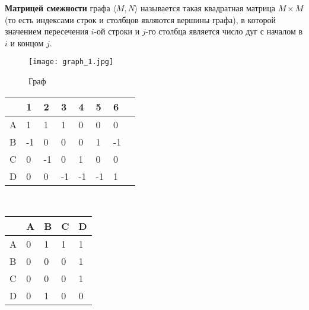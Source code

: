 \vspace{3mm}

\textbf{Матрицей смежности} графа $\langle M, N\rangle$ называется такая квадратная матрица $M \times M$
(то есть индексами строк и столбцов являются вершины графа), 
в которой значением пересечения $i$-ой строки и $j$-го столбца является число дуг с началом в $i$ и концом $j$.

\begin{figure}[!h]
    \centering 
    \texttt{[image: graph\_1.jpg]}
    \caption{Граф}
    \label{graph_for_matrix}
\end{figure}

\begin{figure*}[!h]
    \centering
    \begin{minipage}[t]{4cm}
        \centering
        \begin{tabular}[c]{ | l | l | l | l | l | l | l | l |}
            \hline
              & 1  & 2  & 3  & 4  & 5  & 6  \\ \hline
            A & 1  & 1  & 1  & 0  & 0  & 0  \\ \hline
            B & -1 & 0  & 0  & 0  & 1  & -1 \\ \hline
            C & 0  & -1 & 0  & 1  & 0  & 0  \\ \hline
            D & 0  & 0  & -1 & -1 & -1 & 1  \\
            \hline
        \end{tabular}
    \end{minipage}
    \hspace{3cm}
    \begin{minipage}[t]{4cm}\
        \centering
        \begin{tabular}[c]{ | l | l | l | l | l |}
            \hline
              & A & B & C & D \\ \hline
            A & 0 & 1 & 1 & 1 \\ \hline
            B & 0 & 0 & 0 & 1 \\ \hline
            C & 0 & 0 & 0 & 1 \\ \hline
            D & 0 & 1 & 0 & 0 \\
            \hline
        \end{tabular}
    \end{minipage}
    \caption{Способы матричного представления графа \ref{graph_for_matrix}: матрица инциденций
    и матрица смежности соответственно}
\end{figure*}

\hspace{3mm}

